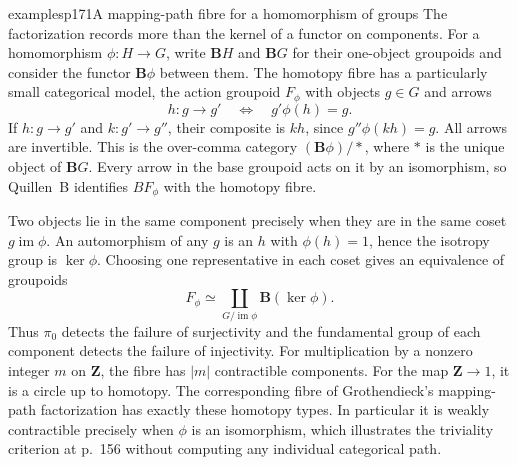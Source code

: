 \begin{dcomment}{examples}{p171}{A mapping-path fibre for a homomorphism of groups}
The factorization records more than the kernel of a functor on components. For a homomorphism $\phi:H\to G$, write $\mathbf B H$ and $\mathbf B G$ for their one-object groupoids and consider the functor $\mathbf B\phi$ between them. The homotopy fibre has a particularly small categorical model, the action groupoid $F_\phi$ with objects $g\in G$ and arrows
\[
 h:g\longrightarrow g'
 \quad\Longleftrightarrow\quad
 g'\phi(h)=g.
\]
If $h:g\to g'$ and $k:g'\to g''$, their composite is $kh$, since $g''\phi(kh)=g$. All arrows are invertible. This is the over-comma category $(\mathbf B\phi)/*$, where $*$ is the unique object of $\mathbf B G$. Every arrow in the base groupoid acts on it by an isomorphism, so Quillen~B identifies $BF_\phi$ with the homotopy fibre.

Two objects lie in the same component precisely when they are in the same coset $g\operatorname{im}\phi$. An automorphism of any $g$ is an $h$ with $\phi(h)=1$, hence the isotropy group is $\ker\phi$. Choosing one representative in each coset gives an equivalence of groupoids
\[
 F_\phi\simeq\coprod_{G/\operatorname{im}\phi}\mathbf B(\ker\phi).
\]
Thus $\pi_0$ detects the failure of surjectivity and the fundamental group of each component detects the failure of injectivity. For multiplication by a nonzero integer $m$ on $\mathbf Z$, the fibre has $|m|$ contractible components. For the map $\mathbf Z\to1$, it is a circle up to homotopy. The corresponding fibre of Grothendieck's mapping-path factorization has exactly these homotopy types. In particular it is weakly contractible precisely when $\phi$ is an isomorphism, which illustrates the triviality criterion at p.~156 without computing any individual categorical path.
\end{dcomment}


